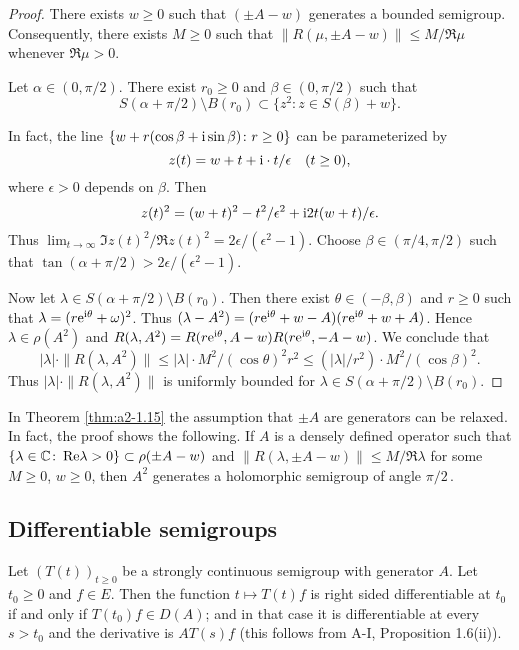 \begin{proof}
There exists $w \geq 0$ such that $(\pm A - w)$ generates a bounded semigroup.
Consequently, there exists $M \geq 0$ such that $\|R(\mu,\pm A - w)\| \leq M/\Re\mu$ whenever $\Re\mu > 0$.

Let $\alpha \in (0,\pi/2)$.
There exist $r_0 \geq 0$ and $\beta \in (0,\pi/2)$ such that
\[
    S(\alpha+\pi/2)\setminus B(r_{0}) \subset \{ z^2 \colon z \in S(\beta) + w \}.
\]

In fact, the line 
$ \{w + r(\cos\beta + \mathrm{i} \sin\beta) \colon r \geq 0\} $ 
can be parameterized by 
%
\[
	 z(t) = w + t + \mathrm{i}\cdot t/\epsilon \quad (t \geq 0) ,
\]
%
where $\epsilon > 0$ depends on $\beta$.
Then 
%
\[
	z(t)^2 = (w + t)^2 - t^2/\epsilon^2 + \mathrm{i} 2t(w+t)/\epsilon .
\]
%
Thus $\lim_{t \to \infty} \Im z(t)^2/\Re z(t)^2 = 2\epsilon/(\epsilon^2-1)$.
Choose $\beta \in (\pi/4,\pi/2)$ such that $\tan(\alpha + \pi/2) > 2\epsilon/(\epsilon^2-1)$. 

Now let $\lambda \in S(\alpha+\pi/2)\setminus B(r_{0})$.
Then there exist $\theta \in (-\beta,\beta)$ 
and $r \geq 0$
such that $\lambda = (r\mathrm{e}^{\mathrm{i}\theta}+\omega)^2$.
Thus $(\lambda-A^2) = (r\mathrm{e}^{\mathrm{i}\theta}+w - A)(r\mathrm{e}^{\mathrm{i}\theta}+w + A)$.
Hence $\lambda \in \rho(A^2)$ and $R(\lambda,A^2) = R(r\mathrm{e}^{\mathrm{i}\theta},A-w)R(r\mathrm{e}^{\mathrm{i}\theta},-A-w)$.
We conclude that 
\[
|\lambda| \cdot \|R(\lambda,A^2)\| \leq |\lambda| \cdot M^2/(\cos\theta)^2r^2 \leq (|\lambda|/r^2)\cdot M^2/(\cos\beta)^2.
\]
Thus $|\lambda| \cdot \|R(\lambda,A^2)\|$ is uniformly bounded for $\lambda \in S(\alpha+\pi/2) \setminus B(r_0)$.
\end{proof}
\begin{remark*}\label{rem:a2-1.7-kgk}
In Theorem  \ref{thm:a2-1.15}  
the assumption that $\pm A$ are generators can be relaxed.
In fact, the proof shows the following.
If $A$ is a densely defined operator such that 
$\{\lambda \in \mathbb{C} \colon \mathop{}\!\mathrm{Re}\lambda > 0\} \subset \rho(\pm A - w)$ and 
$\|R(\lambda,\pm A - w)\| \leq M/\Re\lambda$ for some $M \geq 0$, $w \geq 0$, then $A^2$ generates a holomorphic semigroup of angle $\pi/2$\,.
\end{remark*}

\subsection{Differentiable semigroups} \label{subsec:a2-1.se5}
Let $(T(t))_{t\geq 0}$ be a strongly continuous semigroup with generator $A$.
Let $t_0 \geq 0$ and $f \in E$.
Then the function $t \mapsto T(t)f$ is right sided differentiable at $t_0$ if and only if $T(t_0)f \in D(A)$; and in that case it is differentiable at every $s > t_0$ and the derivative is $AT(s)f$ (this follows from A-I, Proposition 1.6(ii)).

